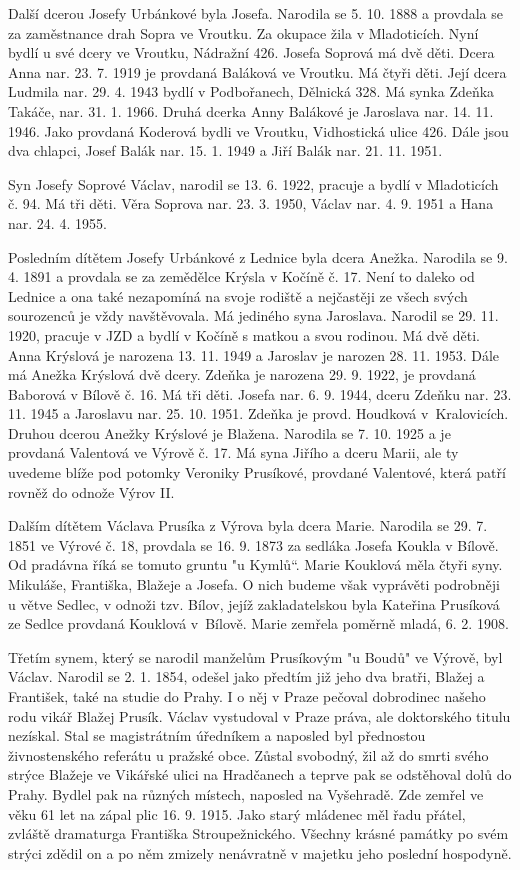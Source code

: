\documentclass[../dejiny-rodu-prusiku.tex]{subfiles}
\begin{document}
Další dcerou Josefy Urbánkové byla Josefa. Narodila se 5. 10. 1888 a provdala se za zaměstnance drah Sopra ve Vroutku. Za okupace žila v Mladoticích. Nyní bydlí u své dcery ve Vroutku, Nádražní 426. Josefa Soprová má dvě děti. Dcera Anna nar. 23. 7. 1919 je provdaná Baláková ve Vroutku. Má čtyři děti. Její dcera Ludmila nar. 29. 4. 1943
bydlí v Podbořanech, Dělnická 328. Má synka Zdeňka Takáče, nar. 31. 1. 1966. Druhá dcerka Anny Balákové je Jaroslava nar. 14. 11. 1946. Jako provdaná Koderová bydli ve Vroutku, Vidhostická ulice 426. Dále jsou dva chlapci, Josef Balák nar. 15. 1. 1949 a Jiří Balák nar. 21. 11. 1951.

Syn Josefy Soprové Václav, narodil se 13. 6. 1922, pra­cuje a bydlí v Mladoticích č. 94. Má tři děti. Věra Soprova nar. 23. 3. 1950, Václav nar. 4. 9. 1951 a Hana nar. 24. 4. 1955.

Posledním dítětem Josefy Urbánkové z Lednice byla dcera Anežka. Narodila se 9. 4. 1891 a provdala se za zemědělce Krýsla v Kočíně č. 17. Není to daleko od Lednice a ona také nezapomíná na svoje rodiště a nejčastěji ze všech svých sourozenců je vždy navštěvova­la. Má jediného syna Jaroslava. Narodil se 29. 11. 1920, pracuje v JZD a bydlí v Kočíně s matkou a svou rodi­nou. Má dvě děti. Anna Krýslová je narozena 13. 11. 1949 a Jaroslav je narozen 28. 11. 1953. Dále má Anežka Krýslová dvě dcery. Zdeňka je narozena 29. 9. 1922, je provdaná Baborová v Bílově č. 16. Má tři děti. Josefa nar. 6. 9. 1944, dceru Zdeňku nar. 23. 11. 1945 a Jaroslavu nar. 25. 10. 1951. Zdeňka je provd. Houdková v Kralovicích. Druhou dcerou Anežky Krýslové je Blažena. Narodila se 7. 10. 1925 a je provdaná Valentová ve Výrově č. 17. Má syna Jiřího a dceru Marii, ale ty uvedeme blíže pod potomky Veroniky Prusíkové, provdané Valentové, která patří rovněž do odnože Výrov II.

Dalším dítětem Václava Prusíka z Výrova byla dcera Marie. Narodila se 29. 7. 1851 ve Výrové č. 18, provdala se 16. 9. 1873 za sedláka Josefa Koukla v Bílově. Od pradávna říká se tomuto gruntu "u Kymlů“. Marie Kouklová měla čtyři syny. Mikuláše, Františka, Blažeje a Josefa. O nich budeme však vyprávěti podrobněji u větve Sedlec, v odnoži tzv. Bílov, jejíž zakladatelskou byla Kateřina Prusíková ze Sedlce provdaná Kouklová v Bílově. Marie zemřela poměrně mladá, 6. 2. 1908.

Třetím synem, který se narodil manželům Prusíkovým "u Boudů" ve Výrově, byl Václav. Narodil se 2. 1. 1854, odešel jako předtím již jeho dva bratři, Blažej a František, také na studie do Prahy. I o něj v Praze pe­čoval dobrodinec našeho rodu vikář Blažej Prusík. Václav vystudoval v Praze práva, ale doktorského titu­lu nezískal. Stal se magistrátním úředníkem a naposled byl přednostou živnostenského referátu u pražské obce. Zůstal svobodný, žil až do smrti svého strýce Blažeje ve Vikářské ulici na Hradčanech a teprve pak se odstě­hoval dolů do Prahy. Bydlel pak na různých místech, naposled na Vyšehradě. Zde zemřel ve věku 61 let na zápal plic 16. 9. 1915. Jako starý mládenec měl řadu přátel, zvláště dramaturga Františka Stroupežnického. Všechny krásné památky po svém strýci zdědil on a po něm zmize­ly nenávratně v majetku jeho poslední hospodyně.
\end{document}
